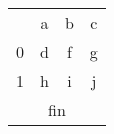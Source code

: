 \documentclass[a4paper]{amsart}
\begin{document}
\begin{tabular}{c|c|c|c|}
     &a    &b    &c  \\ \cline{1-4}
0   & d   & f   & g  \\ \cline{1-4}
1   & h   & i   & j  \\ \cline{1-4}
\multicolumn{4}{|c|}{fin} \\ \cline{1-4}
\end{tabular}
\end{document}
